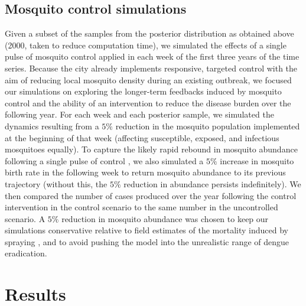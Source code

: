 \documentclass[10pt,letterpaper]{article}
\begin{document}
\subsection*{Mosquito control simulations}

Given a subset of the samples from the posterior distribution as obtained above (2000, taken to reduce computation time), we simulated the effects of a single pulse of mosquito control applied in each week of the first three years of the time series.
Because the city already implements responsive, targeted control with the aim of reducing local mosquito density during an existing outbreak, we focused our simulations on exploring the longer-term feedbacks induced by mosquito control and the ability of an intervention to reduce the disease burden over the following year.
For each week and each posterior sample, we simulated the dynamics resulting from a $5\%$ reduction in the mosquito population implemented at the beginning of that week (affecting susceptible, exposed, and infectious mosquitoes equally).
To capture the likely rapid rebound in mosquito abundance following a single pulse of control \cite{Focks1987, Burattini2008}, we also simulated a $5\%$ increase in mosquito birth rate in the following week to return mosquito abundance to its previous trajectory (without this, the $5\%$ reduction in abundance persists indefinitely).
We then compared the number of cases produced over the year following the control intervention in the control scenario to the same number in the uncontrolled scenario.
A $5\%$ reduction in mosquito abundance was chosen to keep our simulations conservative relative to field estimates of the mortality induced by spraying \cite{Esu2010}, and to avoid pushing the model into the unrealistic range of dengue eradication.

\section*{Results}
\end{document}
